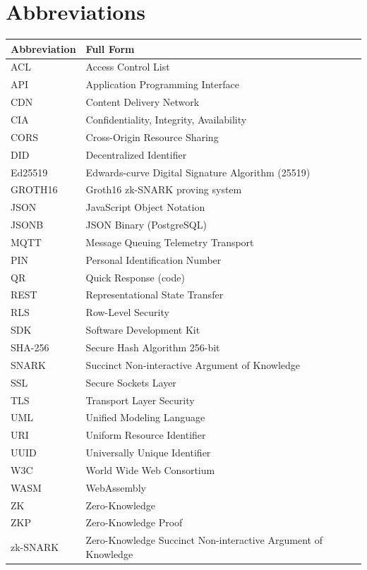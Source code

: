 \newpage
\chapter*{Abbreviations}

\begin{longtable}{p{3cm} p{10cm}}
\toprule
\textbf{Abbreviation} & \textbf{Full Form} \\
\midrule
\endhead
ACL & Access Control List \\
API & Application Programming Interface \\
CDN & Content Delivery Network \\
CIA & Confidentiality, Integrity, Availability \\
CORS & Cross-Origin Resource Sharing \\
DID & Decentralized Identifier \\
Ed25519 & Edwards-curve Digital Signature Algorithm (25519) \\
GROTH16 & Groth16 zk-SNARK proving system \\
JSON & JavaScript Object Notation \\
JSONB & JSON Binary (PostgreSQL) \\
MQTT & Message Queuing Telemetry Transport \\
PIN & Personal Identification Number \\
QR & Quick Response (code) \\
REST & Representational State Transfer \\
RLS & Row-Level Security \\
SDK & Software Development Kit \\
SHA-256 & Secure Hash Algorithm 256-bit \\
SNARK & Succinct Non-interactive Argument of Knowledge \\
SSL & Secure Sockets Layer \\
TLS & Transport Layer Security \\
UML & Unified Modeling Language \\
URI & Uniform Resource Identifier \\
UUID & Universally Unique Identifier \\
W3C & World Wide Web Consortium \\
WASM & WebAssembly \\
ZK & Zero-Knowledge \\
ZKP & Zero-Knowledge Proof \\
zk-SNARK & Zero-Knowledge Succinct Non-interactive Argument of Knowledge \\
\bottomrule
\end{longtable}
